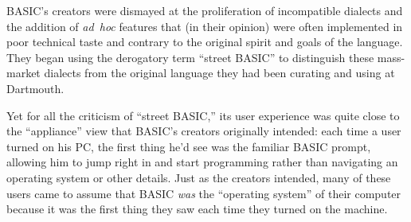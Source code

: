 BASIC's creators were dismayed at the proliferation of incompatible
dialects and the addition of \emph{ad~hoc} features that (in their
opinion) were
often implemented in poor technical taste and contrary to the original
spirit and goals of 
the language.  They began using the derogatory term ``street BASIC'' to
distinguish these mass-market dialects from the original language they
had been curating and using at Dartmouth.

Yet for all the criticism of ``street BASIC,'' its user
experience was quite close to the ``appliance'' view that BASIC's
creators originally intended:
each time a user turned on his PC, the first thing he'd see was the
familiar BASIC prompt, allowing him to jump right in and start
programming rather than navigating an operating system or other details.
Just as the creators intended, many of these users came to assume that
BASIC \emph{was} the ``operating 
system'' of their computer because it was the first thing they saw
each time they turned on the machine.
